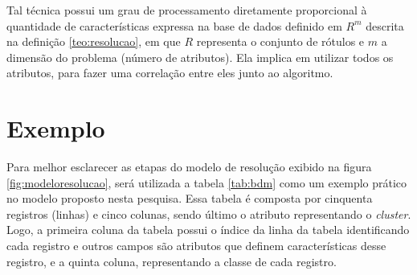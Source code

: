 
Tal técnica possui um grau de processamento diretamente proporcional à quantidade de características expressa na base de dados definido em ${R^m}$ descrita na definição  \ref{teo:resolucao}, em que ${R}$ representa o conjunto de rótulos e ${m}$ a dimensão do problema (número de atributos). Ela implica em utilizar todos os atributos, para fazer uma correlação entre eles junto ao algoritmo. 



\section{Exemplo} \label{cap:ferramentas:sec:exebasemodfic}

Para melhor esclarecer as etapas do modelo de resolução exibido na figura \ref{fig:modeloresolucao}, será utilizada a tabela \ref{tab:bdm} como um exemplo prático no modelo proposto nesta pesquisa. Essa tabela é composta por cinquenta registros (linhas) e cinco colunas, sendo último o atributo representando o \textit{cluster}. Logo, a primeira coluna da tabela possui o índice da linha da tabela identificando cada registro e outros campos são atributos que definem características desse registro, e a quinta coluna, representando a classe de cada registro.

